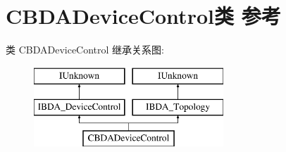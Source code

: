 \hypertarget{class_c_b_d_a_device_control}{}\section{C\+B\+D\+A\+Device\+Control类 参考}
\label{class_c_b_d_a_device_control}
类 C\+B\+D\+A\+Device\+Control 继承关系图\+:\begin{figure}[H]
\begin{center}
\leavevmode
\includegraphics[height=3.000000cm]{class_c_b_d_a_device_control}
\end{center}
\end{figure}
